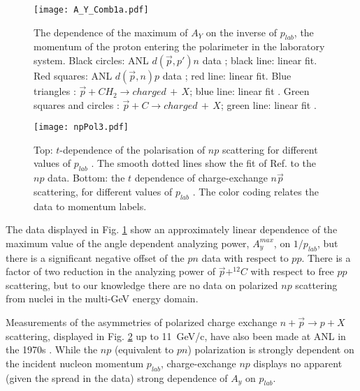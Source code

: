 \documentclass[epj]{svjour}
\begin{document}
\begin{figure}
\begin{centering}
\texttt{[image: A\_Y\_Comb1a.pdf]} 
\par\end{centering}
\caption{\label{fig:Dep-Ay1}The dependence of the maximum of $A_{Y}$ on the inverse of $p_{lab}$, the momentum of the proton entering the polarimeter in the laboratory system. 
Black circles: ANL $d(\vec{p},p')n$ data \cite{PhysRevLett.35.632,Kramer:1977pf};
black line: linear fit. Red squares: ANL $d(\vec{p},n)p$ data \cite{Cheung:1995ei,Alekseev:1999ag} ;
red line: linear fit. Blue triangles \cite{Azhgirey:2004yk}: $\vec{p}+ CH_{2} \to charged\,+\,X$;
blue line: linear fit \cite{Azhgirey:2004yk}. Green squares \cite{Cheung:1995ei}
and circles \cite{Alekseev:1999ag}: $\vec{p}+ C\to charged\,+\,X$;
green line: linear fit \cite{Azhgirey:2004yk}. }
\end{figure}

\begin{figure}[htb]
\begin{centering}  
\texttt{[image: npPol3.pdf]}
\par\end{centering}
\caption{\label{fig:Dep-Ay}Top:  $t$-dependence of the
polarisation of $np$ scattering  for different values of $p_{lab}$ \cite{PhysRevLett.35.632,Kramer:1977pf}. The smooth
dotted lines show the fit of Ref. \cite{Ladygin:409018} to the $np$ data.
Bottom: the $t$ dependence of charge-exchange $n \vec p$
scattering, for different values of $p_{lab}$ \cite{PhysRevLett.30.1183,Robrish:1970jw}. The color coding relates the data
to momentum labels. }
\end{figure}

The data displayed in Fig. \ref{fig:Dep-Ay1} show an approximately 
linear dependence of the maximum value of the angle dependent analyzing power, $A_{y}^{max}$, on $1/p_{lab}$, but there is
a significant negative offset of the $pn$ data with respect to $pp$. There is a factor of two reduction in the analyzing power of $\vec{p}+^{12}\!C$ with respect to free $pp$ scattering, but to our knowledge there
are no data on polarized $np$ scattering from nuclei in the multi-GeV
energy domain.

Measurements of the asymmetries of polarized charge exchange $n+\vec{p}\to p+X$
scattering, displayed in Fig. \ref{fig:Dep-Ay} up to 11~GeV/c,  have also been made at ANL in
the 1970s \cite{Robrish:1970jw,PhysRevLett.30.1183}.
While the $np$ (equivalent to $pn$) polarization is strongly dependent on the incident nucleon momentum $p_{lab}$, charge-exchange $np$ displays no apparent (given the spread in the data) strong dependence of $A_{y}$ on $p_{lab}$.
\end{document}
